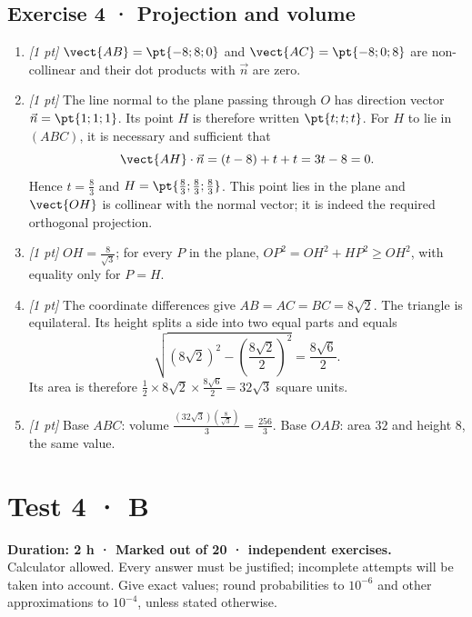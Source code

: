 \subsection*{Exercise 4 · Projection and volume}\begin{enumerate}

\item \textit{[1 pt]} $\vect{AB}=\pt{-8;8;0}$ and $\vect{AC}=\pt{-8;0;8}$ are non-collinear and their dot products with $\vec n$ are zero.

\item \textit{[1 pt]} The line normal to the plane passing through $O$ has direction vector $\vec n=\pt{1;1;1}$. Its point $H$ is therefore written $\pt{t;t;t}$. For $H$ to lie in $(ABC)$, it is necessary and sufficient that
\[\vect{AH}\cdot\vec n=(t-8)+t+t=3t-8=0.\]
Hence $t=\frac{8}{3}$ and $H=\pt{\frac{8}{3};\frac{8}{3};\frac{8}{3}}$. This point lies in the plane and $\vect{OH}$ is collinear with the normal vector; it is indeed the required orthogonal projection.

\item \textit{[1 pt]} $OH=\frac{8}{\sqrt{3}}$; for every $P$ in the plane, $OP^2=OH^2+HP^2\ge OH^2$, with equality only for $P=H$.

\item \textit{[1 pt]} The coordinate differences give $AB=AC=BC=8\sqrt2$. The triangle is equilateral. Its height splits a side into two equal parts and equals
\[\sqrt{(8\sqrt2)^2-(\frac{8\sqrt{2}}{2})^2}=\frac{8\sqrt6}{2}.\]
Its area is therefore $\frac12\times 8\sqrt2\times\frac{8\sqrt6}{2}=32\sqrt3$ square units.

\item \textit{[1 pt]} Base $ABC$: volume $\frac{(32\sqrt3)(\frac{8}{\sqrt{3}})}{3}=\frac{256}{3}$. Base $OAB$: area $32$ and height $8$, the same value.

\end{enumerate}

\fi

\fi

\ifmxteacher

\mxnewpage{}\label{sujet:6-4}

\section*{Test 4 · B}


\textbf{Duration: 2 h · Marked out of 20 ·  independent exercises.}\\Calculator allowed. Every answer must be justified; incomplete attempts will be taken into account. Give exact values; round probabilities to $10^{-6}$ and other approximations to $10^{-4}$, unless stated otherwise.

